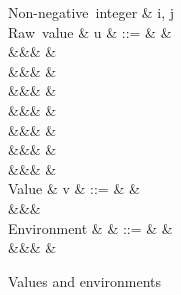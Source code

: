 \begin{figure}[H]
\begin{syntaxfig}
\mbox{Non-negative integer}
&
i, j
\\[2mm]
\mbox{Raw value}
&
u
&
::=
&
\exTrue \mid \exFalse
&
\\
&&&
&
\\
&&&
\exPrim{\phi}
&
\\
&&&
&
\\
&&&
&
\\
&&&
\exNil
&
\\
&&&
&
\\
&&&
&
\\[2mm]
\mbox{Value}
&
v
&
::=
&
\hole
&
\\
&&&
\\[2mm]
\mbox{Environment}
&
\rho
&
::=
&
\envEmpty
&
\\
&&&
&
\end{syntaxfig}
\caption{Values and environments}
\end{figure}
